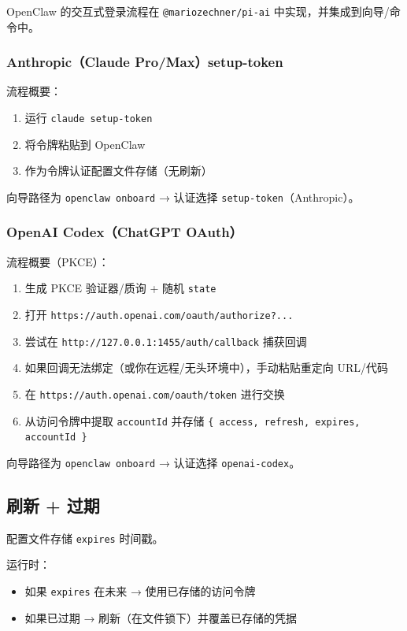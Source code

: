 OpenClaw 的交互式登录流程在 \texttt{@mariozechner/pi-ai} 中实现，并集成到向导/命令中。

\subsubsection{Anthropic（Claude Pro/Max）setup-token}


流程概要：

\begin{enumerate}
  \item 运行 \texttt{claude setup-token}
  \item 将令牌粘贴到 OpenClaw
  \item 作为令牌认证配置文件存储（无刷新）
\end{enumerate}


向导路径为 \texttt{openclaw onboard} → 认证选择 \texttt{setup-token}（Anthropic）。

\subsubsection{OpenAI Codex（ChatGPT OAuth）}


流程概要（PKCE）：

\begin{enumerate}
  \item 生成 PKCE 验证器/质询 + 随机 \texttt{state}
  \item 打开 \texttt{https://auth.openai.com/oauth/authorize?...}
  \item 尝试在 \texttt{http://127.0.0.1:1455/auth/callback} 捕获回调
  \item 如果回调无法绑定（或你在远程/无头环境中），手动粘贴重定向 URL/代码
  \item 在 \texttt{https://auth.openai.com/oauth/token} 进行交换
  \item 从访问令牌中提取 \texttt{accountId} 并存储 \texttt{\{ access, refresh, expires, accountId \}}
\end{enumerate}


向导路径为 \texttt{openclaw onboard} → 认证选择 \texttt{openai-codex}。

\subsection{刷新 + 过期}


配置文件存储 \texttt{expires} 时间戳。

运行时：

\begin{itemize}
  \item 如果 \texttt{expires} 在未来 → 使用已存储的访问令牌
  \item 如果已过期 → 刷新（在文件锁下）并覆盖已存储的凭据
\end{itemize}


